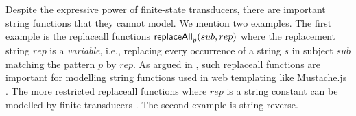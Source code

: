 Despite the expressive power of finite-state transducers, there are important
string functions that they cannot model. We mention two examples. The first 
example is 
the 
replaceall functions $\mathsf{replaceAll}_p(sub,rep)$ where the replacement string 
$rep$ is a \emph{variable}, i.e., replacing every occurrence of a string $s$ in
subject $sub$ matching the pattern $p$ by $rep$. As argued in \cite{CCHLW18},
such replaceall
functions are important for modelling string functions used in web 
templating like Mustache.js \cite{Mustache}. The more restricted replaceall
functions where $rep$ is a string constant can be modelled by finite 
transducers \cite{LB16}.
The second example is string reverse.



%
%


